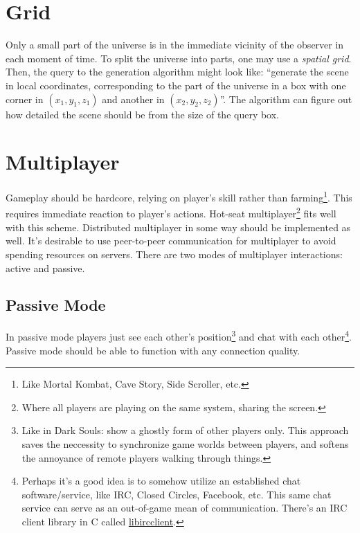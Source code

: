 \documentclass[12pt]{article}
\begin{document}
\section{Grid}

Only a small part of the universe is in the immediate vicinity of the observer
in each moment of time.
To split the universe into parts, one may use a \emph{spatial grid}.
Then, the query to the generation algorithm might look like:
``generate the scene in local coordinates, corresponding to the part of the
universe in a box with one corner in \((x_1, y_1, z_1)\) and another in
\((x_2, y_2, z_2)\)''.
The algorithm can figure out how detailed the scene should be from the size of
the query box.

\section{Multiplayer}

Gameplay should be hardcore, relying on player's skill rather than
farming\footnote{
    Like Mortal Kombat, Cave Story, Side Scroller, etc.}.
This requires immediate reaction to player's actions.
Hot-seat multiplayer\footnote{
    Where all players are playing on the same system, sharing
    the screen.
} fits well with this scheme.
Distributed multiplayer in some way should be implemented as well.
It's desirable to use peer-to-peer communication for multiplayer
to avoid spending resources on servers.
There are two modes of multiplayer interactions: active and passive.

\subsection{Passive Mode}

In passive mode players just see each other's position\footnote{
    Like in Dark Souls: show a ghostly form of other players only.
    This approach saves the neccessity to synchronize game worlds
    between players, and softens the annoyance of remote players
    walking through things.
} and chat with each other\footnote{
    \label{Chat}
    Perhaps it's a good idea is to somehow utilize an established chat
    software/service, like IRC, Closed Circles, Facebook, etc.
    This same chat service can serve as an out-of-game mean of
    communication.
    There's an IRC client library in C called
    \href{http://www.ulduzsoft.com/libircclient/index.html}%
    {libircclient}.
}.
Passive mode should be able to function with any connection quality.
\end{document}
